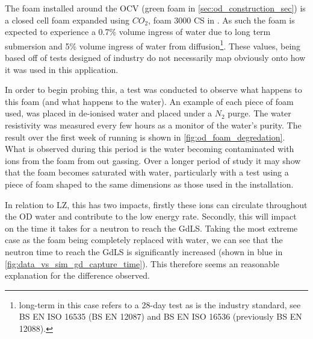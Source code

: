 \par
The foam installed around the OCV (green foam in \autoref{sec:od_construction_sec}) is a closed cell foam expanded using $CO_2$, foam 3000 CS in \cite{styrodur_water_ingress_ref}.
As such the foam is expected to experience a 0.7\% volume ingress of water due to long term submersion and 5\% volume ingress of water from diffusion\footnote{long-term in this case refers to a 28-day test as is the industry standard, see BS EN ISO 16535 (BS EN 12087) and BS EN ISO 16536 (previously BS EN 12088).}.
These values, being based off of tests designed of industry do not necessarily map obviously onto how it was used in this application.
\par
In order to begin probing this, a test was conducted to observe what happens to this foam (and what happens to the water).
An example of each piece of foam used, was placed in de-ionised water and placed under a $N_2$ purge. 
The water resistivity was measured every few hours as a monitor of the water's purity.
The result over the first week of running is shown in \autoref{fig:od_foam_degredation}.
What is observed during this period is the water becoming contaminated with ions from the foam from out gassing.
Over a longer period of study it may show that the foam becomes saturated with water, particularly with a test using a piece of foam shaped to the same dimensions as those used in the installation.

\par
In relation to LZ, this has two impacts, firstly these ions can circulate throughout the OD water and contribute to the low energy rate.
Secondly, this will impact on the time it takes for a neutron to reach the GdLS.
Taking the most extreme case as the foam being completely replaced with water, we can see that the neutron time to reach the GdLS is significantly increased (shown in blue in \autoref{fig:data_vs_sim_gd_capture_time}).
This therefore seems an reasonable explanation for the difference observed.




